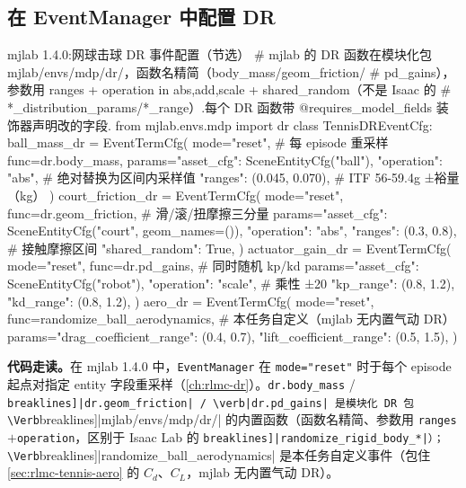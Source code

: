 \subsection{在 EventManager 中配置 DR}

\begin{codebox}[Python]{mjlab 1.4.0:网球击球 DR 事件配置（节选）}
# mjlab 的 DR 函数在模块化包 mjlab/envs/mdp/dr/，函数名精简（body_mass/geom_friction/
# pd_gains），参数用 ranges + operation in {abs,add,scale} + shared_random（不是 Isaac 的
# *_distribution_params/*_range）.每个 DR 函数带 @requires_model_fields 装饰器声明改的字段.
from mjlab.envs.mdp import dr
class TennisDREventCfg:
    ball_mass_dr = EventTermCfg(
        mode="reset",                                # 每 episode 重采样
        func=dr.body_mass,
        params={"asset_cfg": SceneEntityCfg("ball"),
                "operation": "abs",                  # 绝对替换为区间内采样值
                "ranges": (0.045, 0.070)},           # ITF 56-59.4g ±裕量（kg）
    )
    court_friction_dr = EventTermCfg(
        mode="reset",
        func=dr.geom_friction,                       # 滑/滚/扭摩擦三分量
        params={"asset_cfg": SceneEntityCfg("court", geom_names=()),
                "operation": "abs",
                "ranges": (0.3, 0.8),                # 接触摩擦区间
                "shared_random": True},
    )
    actuator_gain_dr = EventTermCfg(
        mode="reset",
        func=dr.pd_gains,                            # 同时随机 kp/kd
        params={"asset_cfg": SceneEntityCfg("robot"),
                "operation": "scale",                # 乘性 ±20%
                "kp_range": (0.8, 1.2),
                "kd_range": (0.8, 1.2)},
    )
    aero_dr = EventTermCfg(
        mode="reset",
        func=randomize_ball_aerodynamics,            # 本任务自定义（mjlab 无内置气动 DR）
        params={"drag_coefficient_range": (0.4, 0.7),
                "lift_coefficient_range": (0.5, 1.5)},
    )
\end{codebox}

\textbf{代码走读。}在 mjlab 1.4.0 中，\verb|EventManager| 在 \verb|mode="reset"| 时于每个 episode 起点对指定 entity 字段重采样（\cref{ch:rlmc-dr}）。\verb|dr.body_mass| / \Verb[breaklines]|dr.geom_friction| / \verb|dr.pd_gains| 是模块化 DR 包 \Verb[breaklines]|mjlab/envs/mdp/dr/| 的内置函数（函数名精简、参数用 \verb|ranges|$+$\verb|operation|，区别于 Isaac Lab 的 \Verb[breaklines]|randomize_rigid_body_*|）；\Verb[breaklines]|randomize_ball_aerodynamics| 是本任务自定义事件（包住 \cref{sec:rlmc-tennis-aero} 的 $C_d$、$C_L$，mjlab 无内置气动 DR）。

